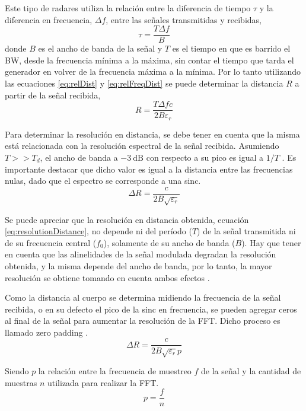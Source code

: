 Este tipo de radares utiliza la relación entre la diferencia de tiempo $\tau$ y la diferencia en frecuencia, $\Delta f$, entre las señales transmitidas y recibidas,
\begin{equation}\label{eq:relFreqDist}
  \tau = \dfrac{T\Delta f}{B}
\end{equation}
donde $B$ es el ancho de banda de la señal y $T$ es el tiempo en que es barrido el BW, desde la frecuencia mínima a la máxima, sin contar el tiempo que tarda el generador en volver de la frecuencia máxima a la mínima. Por lo tanto utilizando las ecuaciones \ref{eq:relDist} y \ref{eq:relFreqDist} se puede determinar la distancia $R$ a partir de la señal recibida,
\begin{equation}\label{eq:receivedDist}
  R = \dfrac{T\Delta fc}{2B\varepsilon_r}
\end{equation}

Para determinar la resolución en distancia, se debe tener en cuenta que la misma está relacionada con la resolución espectral de la señal recibida. Asumiendo $T >> T_d$, el ancho de banda a $\SI{-3}{\dB}$ con respecto a su pico es igual a $1/T$ \cite{Brooker2005}. Es importante destacar que dicho valor es igual a la distancia entre las frecuencias nulas, dado que el espectro se corresponde a una sinc.
\begin{equation}\label{eq:resolutionDistance}
  \Delta R = \dfrac{c}{2B\sqrt{\varepsilon_r}}
\end{equation}

Se puede apreciar que la resolución en distancia obtenida, ecuación \ref{eq:resolutionDistance}, no depende ni del período ($T$) de la señal transmitida ni de su frecuencia central ($f_0$), solamente de su ancho de banda ($B$). Hay que tener en cuenta que las alinelidades de la señal modulada degradan la resolución obtenida, y la misma depende del ancho de banda, por lo tanto, la mayor resolución se obtiene tomando en cuenta ambos efectos \cite{Brooker2005}.

Como la distancia al cuerpo se determina midiendo la frecuencia de la señal recibida, o en su defecto el pico de la sinc en frecuencia, se pueden agregar ceros al final de la señal para aumentar la resolución de la FFT. Dicho proceso es llamado zero padding \cite{Oppenheim1990}.
\begin{equation}\label{eq:resolutionDistance2}
  \Delta R = \dfrac{c}{2B\sqrt{\varepsilon_r}p}
\end{equation}

Siendo $p$ la relación entre la frecuencia de muestreo $f$ de la señal y la cantidad de muestras $n$ utilizada para realizar la FFT.
\begin{equation}
  p = \frac{f}{n}
\end{equation}


